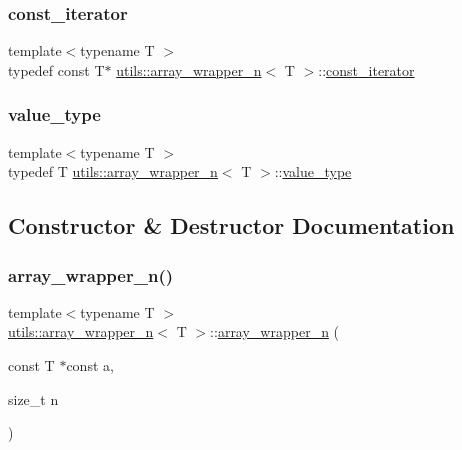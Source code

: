 \subsubsection{\texorpdfstring{const\_iterator}{const\_iterator}}
{\footnotesize\ttfamily template$<$typename T $>$ \\
typedef const T$\ast$ \mbox{\hyperlink{structutils_1_1array__wrapper__n}{utils\+::array\+\_\+wrapper\+\_\+n}}$<$ T $>$\+::\mbox{\hyperlink{structutils_1_1array__wrapper__n_adb47a0f037e288f0ba32d90176849e3d}{const\+\_\+iterator}}}

\mbox{\label{structutils_1_1array__wrapper__n_ae658b4079e73a8bb06a0e63b50e36958}} 
\subsubsection{\texorpdfstring{value\_type}{value\_type}}
{\footnotesize\ttfamily template$<$typename T $>$ \\
typedef T \mbox{\hyperlink{structutils_1_1array__wrapper__n}{utils\+::array\+\_\+wrapper\+\_\+n}}$<$ T $>$\+::\mbox{\hyperlink{structutils_1_1array__wrapper__n_ae658b4079e73a8bb06a0e63b50e36958}{value\+\_\+type}}}



\subsection{Constructor \& Destructor Documentation}
\mbox{\label{structutils_1_1array__wrapper__n_ac000dd4d2f22c1963079cefc68cf2c68}} 
\subsubsection{\texorpdfstring{array\_wrapper\_n()}{array\_wrapper\_n()}}
{\footnotesize\ttfamily template$<$typename T $>$ \\
\mbox{\hyperlink{structutils_1_1array__wrapper__n}{utils\+::array\+\_\+wrapper\+\_\+n}}$<$ T $>$\+::\mbox{\hyperlink{structutils_1_1array__wrapper__n}{array\+\_\+wrapper\+\_\+n}} (\begin{DoxyParamCaption}\item[{const T $\ast$const}]{a,  }\item[{size\+\_\+t}]{n }\end{DoxyParamCaption})\hspace{0.3cm}{\ttfamily [inline]}}



